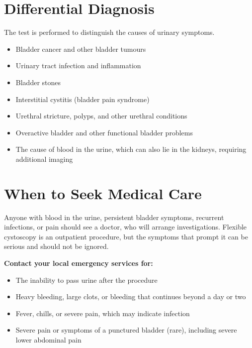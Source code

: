 \section*{Differential Diagnosis}
The test is performed to distinguish the causes of urinary symptoms.
\begin{itemize}
    \item Bladder cancer and other bladder tumours
    \item Urinary tract infection and inflammation
    \item Bladder stones
    \item Interstitial cystitis (bladder pain syndrome)
    \item Urethral stricture, polyps, and other urethral conditions
    \item Overactive bladder and other functional bladder problems
    \item The cause of blood in the urine, which can also lie in the kidneys, requiring additional imaging
\end{itemize}

\section*{When to Seek Medical Care}
Anyone with blood in the urine, persistent bladder symptoms, recurrent infections, or pain should see a doctor, who will arrange investigations. Flexible cystoscopy is an outpatient procedure, but the symptoms that prompt it can be serious and should not be ignored.

\textbf{Contact your local emergency services for:}
\begin{itemize}
    \item The inability to pass urine after the procedure
    \item Heavy bleeding, large clots, or bleeding that continues beyond a day or two
    \item Fever, chills, or severe pain, which may indicate infection
    \item Severe pain or symptoms of a punctured bladder (rare), including severe lower abdominal pain
\end{itemize}

